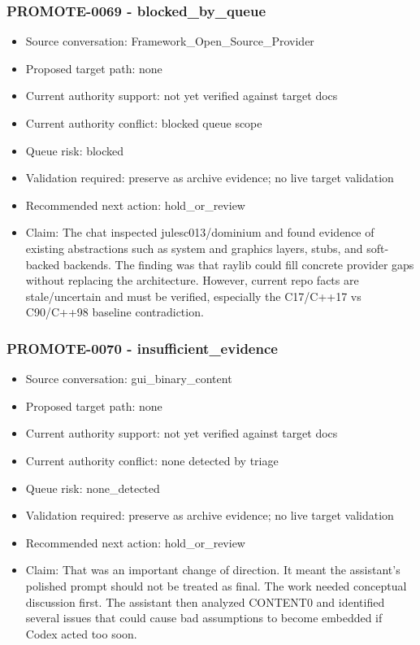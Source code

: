 \documentclass[11pt,a4paper]{report}
\begin{document}
\subsubsection{PROMOTE-0069 - blocked\_by\_queue}

\begin{itemize}
\item Source conversation: Framework\_Open\_Source\_Provider
\item Proposed target path: none
\item Current authority support: not yet verified against target docs
\item Current authority conflict: blocked queue scope
\item Queue risk: blocked
\item Validation required: preserve as archive evidence; no live target validation
\item Recommended next action: hold\_or\_review
\item Claim: The chat inspected julesc013/dominium and found evidence of existing abstractions such as system and graphics layers, stubs, and soft-backed backends. The finding was that raylib could fill concrete provider gaps without replacing the architecture. However, current repo facts are stale/uncertain and must be verified, especially the C17/C++17 vs C90/C++98 baseline contradiction.
\end{itemize}

\subsubsection{PROMOTE-0070 - insufficient\_evidence}

\begin{itemize}
\item Source conversation: gui\_binary\_content
\item Proposed target path: none
\item Current authority support: not yet verified against target docs
\item Current authority conflict: none detected by triage
\item Queue risk: none\_detected
\item Validation required: preserve as archive evidence; no live target validation
\item Recommended next action: hold\_or\_review
\item Claim: That was an important change of direction. It meant the assistant's polished prompt should not be treated as final. The work needed conceptual discussion first. The assistant then analyzed CONTENT0 and identified several issues that could cause bad assumptions to become embedded if Codex acted too soon.
\end{itemize}
\end{document}
